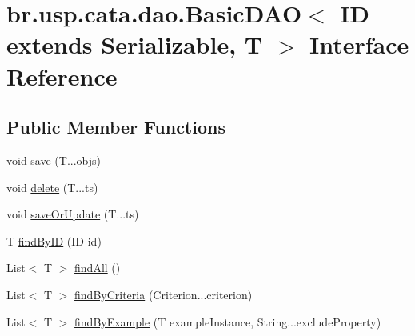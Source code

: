 \hypertarget{interfacebr_1_1usp_1_1cata_1_1dao_1_1_basic_d_a_o_3_01_i_d_01extends_01_serializable_00_01_t_01_4}{\section{br.\+usp.\+cata.\+dao.\+Basic\+D\+A\+O$<$ I\+D extends Serializable, T $>$ Interface Reference}
\label{interfacebr_1_1usp_1_1cata_1_1dao_1_1_basic_d_a_o_3_01_i_d_01extends_01_serializable_00_01_t_01_4}
}
\subsection*{Public Member Functions}
\begin{DoxyCompactItemize}
\item 
void \hyperlink{interfacebr_1_1usp_1_1cata_1_1dao_1_1_basic_d_a_o_3_01_i_d_01extends_01_serializable_00_01_t_01_4_a718090d5861bc2ba506f64d0870fe188}{save} (T...\+objs)
\item 
void \hyperlink{interfacebr_1_1usp_1_1cata_1_1dao_1_1_basic_d_a_o_3_01_i_d_01extends_01_serializable_00_01_t_01_4_aeb497f8f13a8f33170f323277a9794ea}{delete} (T...\+ts)
\item 
void \hyperlink{interfacebr_1_1usp_1_1cata_1_1dao_1_1_basic_d_a_o_3_01_i_d_01extends_01_serializable_00_01_t_01_4_a2b7778ee7357a5fad77d097c53b66c89}{save\+Or\+Update} (T...\+ts)
\item 
T \hyperlink{interfacebr_1_1usp_1_1cata_1_1dao_1_1_basic_d_a_o_3_01_i_d_01extends_01_serializable_00_01_t_01_4_a65296a268b8715283314d5154c945120}{find\+By\+I\+D} (I\+D id)
\item 
List$<$ T $>$ \hyperlink{interfacebr_1_1usp_1_1cata_1_1dao_1_1_basic_d_a_o_3_01_i_d_01extends_01_serializable_00_01_t_01_4_afaae6e30456f6421572db6b15523be92}{find\+All} ()
\item 
List$<$ T $>$ \hyperlink{interfacebr_1_1usp_1_1cata_1_1dao_1_1_basic_d_a_o_3_01_i_d_01extends_01_serializable_00_01_t_01_4_a731e2ddb71ba01a88e0135fb700b45a2}{find\+By\+Criteria} (Criterion...\+criterion)
\item 
List$<$ T $>$ \hyperlink{interfacebr_1_1usp_1_1cata_1_1dao_1_1_basic_d_a_o_3_01_i_d_01extends_01_serializable_00_01_t_01_4_af0da35b3c090af8d4a565afa48235e86}{find\+By\+Example} (T example\+Instance, String...\+exclude\+Property)
\end{DoxyCompactItemize}


